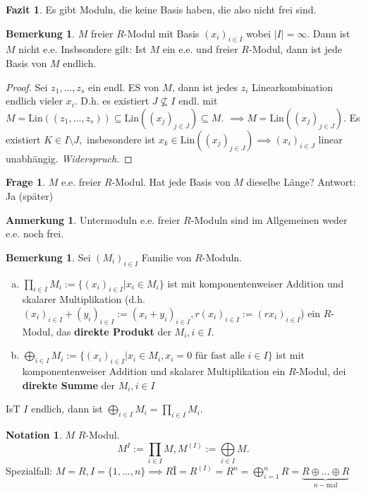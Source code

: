 \documentclass[a4paper, titlepage]{article}
\theoremstyle{definition}
\newtheorem{bem}[satz]{Bemerkung}
\newtheorem*{anm}{Anmerkung}
\newtheorem*{frage}{Frage}
\newtheorem*{notation}{Notation}
\newtheorem*{fazit}{Fazit}
\newcommand{\Lin}{\mathrm{Lin}}
\begin{document}
        \begin{fazit} Es gibt Moduln, die keine Basis haben, die also nicht frei sind.
        \end{fazit}
        \begin{bem}
            $M$ freier $R$-Modul mit Basis $(x_i)_{i\in I}$ wobei $|I|=\infty.$
            Dann ist $M$ nicht e.e. Insbsondere gilt: Ist $M$ ein e.e. und freier $R$-Modul, dann ist jede Basis von $M$ endlich.
        \end{bem}
        \begin{proof}
            Sei $z_1,...,z_s$ ein endl. ES von $M$, dann ist jedes $z_i$ Linearkombination endlich vieler $x_i.$ D.h. es existiert $J\not\subseteq I$ endl. mit $M=\Lin((z_1,...,z_s))\subseteq \Lin((x_j)_{j\in J})\subseteq M.$ $\implies M=\Lin((x_j)_{j\in J}).$ Es existiert $K\in I\setminus J,$ insbesondere ist $x_k\in \Lin((x_j)_{j\in J})\implies (x_i)_{i\in J}$ linear unabhängig. \textit{Widerspruch.}
        \end{proof}
        \begin{frage}
            $M$ e.e. freier $R$-Modul. Hat jede Basis von $M$ dieselbe Länge? \newline 
            Antwort: Ja (später)
        \end{frage}
        \begin{anm}
            Untermoduln e.e. freier $R$-Moduln sind im Allgemeinen weder e.e. noch frei.
        \end{anm}
        \begin{bem}
            Sei $(M_i)_{i\in I}$ Familie von $R$-Moduln.
            \begin{enumerate}[(a)] 
                \item $\prod\limits_{i\in I}M_i:=\{(x_i)_{i\in I}|x_i\in M_i\}$ ist mit komponentenweiser Addition und skalarer Multiplikation (d.h. $(x_i)_{i\in I}+(y_i)_{i\in I}:=(x_i+y_i)_{i\in I}, r(x_i)_{i\in I}:= (rx_i)_{i\in I}$) ein $R$-Modul, das \textbf{direkte Produkt} der $M_i,i\in I.$
                \item $\bigoplus\limits_{i\in I}M_i:=\{(x_i)_{i\in I}|x_i\in M_i,x_i=0\text{ für fast alle }i\in I\}$ ist mit komponentenweiser Addition und skalarer Multiplikation ein $R$-Modul, dei \textbf{direkte Summe} der $M_i,i\in I$
            \end{enumerate}
            IsT $I$ endlich, dann ist $\bigoplus\limits_{i\in I}M_i=\prod\limits_{i\in I}M_i.$
        \end{bem}
        \begin{notation}
            $M$ $R$-Modul. \newline
            $$M^{I}:=\prod\limits_{i\in I}M, M^{(I)}:=\bigoplus\limits_{i\in I}M.$$
            Spezialfall: $M=R, I=\{1,...,n\}\implies RÎ=R^{(I)}=R^n=\bigoplus\limits_{i=1}^{n}R=\underbrace{R\oplus...\oplus R}_{n-\text{mal}}$
        \end{notation}
\end{document}
